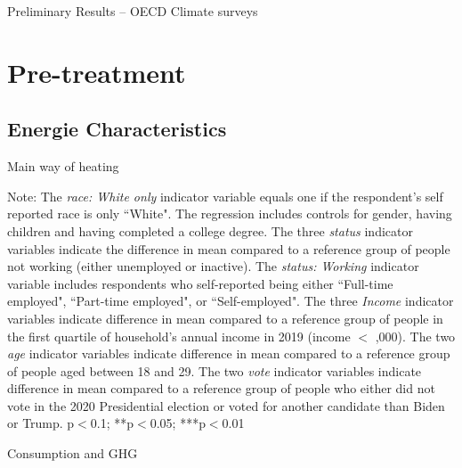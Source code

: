 \documentclass{article}
\begin{document}
\begin{LARGE}
	\begin{center}
		Preliminary Results – OECD Climate surveys	
	\end{center}
	
\end{LARGE}
	\tableofcontents
	\listoftables

\clearpage

\section{Pre-treatment}

\subsection{Energie Characteristics}

\begin{table}[h!]
	\caption{Main way of heating}
	\begin{center}
		\scalebox{0.7}{}
	\end{center}
	{\footnotesize Note: The \textit{race: White only} indicator variable equals one if the respondent's self reported race is only ``White". The regression includes controls for gender, having children and having completed a college degree. The three \textit{status} indicator variables indicate the difference in mean compared to a reference group of people not working (either unemployed or inactive). The \textit{status: Working} indicator variable includes respondents who self-reported being either ``Full-time employed", ``Part-time employed", or ``Self-employed". The three \textit{Income} indicator variables indicate difference in mean compared to a reference group of people in the first quartile of household's annual income in 2019 (income $<$ ,000). The two \textit{age} indicator variables indicate difference in mean compared to a reference group of people aged between 18 and 29. The two \textit{vote} indicator variables indicate difference in mean compared to a reference group of people who either did not vote in the 2020 Presidential election or voted for another candidate than Biden or Trump.
	\newline  *p$<$0.1; **p$<$0.05; ***p$<$0.01}
\end{table}	

\begin{table}[h!]
	\caption{Consumption and GHG}
	\begin{center}
		\scalebox{0.7}{}
	\end{center}
\end{table}	
\end{document}
